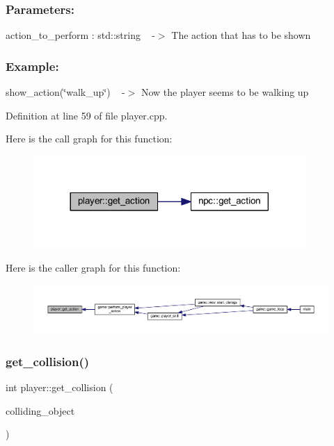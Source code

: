 \subsubsection*{Parameters\+: }

action\+\_\+to\+\_\+perform \+: std\+::string ~\newline
-\/$>$ The action that has to be shown

\subsubsection*{Example\+: }

show\+\_\+action(\char`\"{}walk\+\_\+up\char`\"{}) ~\newline
-\/$>$ Now the player seems to be walking up 

Definition at line 59 of file player.\+cpp.

Here is the call graph for this function\+:
\nopagebreak
\begin{figure}[H]
\begin{center}
\leavevmode
\includegraphics[width=293pt]{classplayer_a676129193d589a975d7a86429a37b1b7_cgraph}
\end{center}
\end{figure}
Here is the caller graph for this function\+:
\nopagebreak
\begin{figure}[H]
\begin{center}
\leavevmode
\includegraphics[width=350pt]{classplayer_a676129193d589a975d7a86429a37b1b7_icgraph}
\end{center}
\end{figure}
\mbox{\label{classplayer_aa405bc495c5a6bced7740352abd4249f}} 
\subsubsection{\texorpdfstring{get\+\_\+collision()}{get\_collision()}}
{\footnotesize\ttfamily int player\+::get\+\_\+collision (\begin{DoxyParamCaption}\item[{sf\+::\+Int\+Rect}]{colliding\+\_\+object }\end{DoxyParamCaption})}



